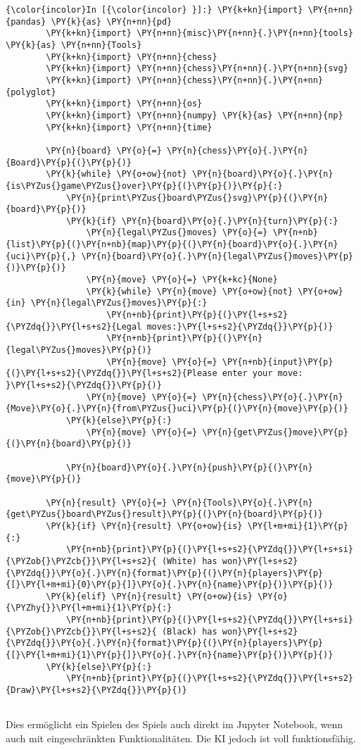     \begin{Verbatim}[commandchars=\\\{\}]
{\color{incolor}In [{\color{incolor} }]:} \PY{k+kn}{import} \PY{n+nn}{pandas} \PY{k}{as} \PY{n+nn}{pd}
        \PY{k+kn}{import} \PY{n+nn}{misc}\PY{n+nn}{.}\PY{n+nn}{tools} \PY{k}{as} \PY{n+nn}{Tools}
        \PY{k+kn}{import} \PY{n+nn}{chess}
        \PY{k+kn}{import} \PY{n+nn}{chess}\PY{n+nn}{.}\PY{n+nn}{svg}
        \PY{k+kn}{import} \PY{n+nn}{chess}\PY{n+nn}{.}\PY{n+nn}{polyglot}
        \PY{k+kn}{import} \PY{n+nn}{os}
        \PY{k+kn}{import} \PY{n+nn}{numpy} \PY{k}{as} \PY{n+nn}{np}
        \PY{k+kn}{import} \PY{n+nn}{time}
        
        \PY{n}{board} \PY{o}{=} \PY{n}{chess}\PY{o}{.}\PY{n}{Board}\PY{p}{(}\PY{p}{)}
        \PY{k}{while} \PY{o+ow}{not} \PY{n}{board}\PY{o}{.}\PY{n}{is\PYZus{}game\PYZus{}over}\PY{p}{(}\PY{p}{)}\PY{p}{:}
            \PY{n}{print\PYZus{}board\PYZus{}svg}\PY{p}{(}\PY{n}{board}\PY{p}{)}
            \PY{k}{if} \PY{n}{board}\PY{o}{.}\PY{n}{turn}\PY{p}{:}
                \PY{n}{legal\PYZus{}moves} \PY{o}{=} \PY{n+nb}{list}\PY{p}{(}\PY{n+nb}{map}\PY{p}{(}\PY{n}{board}\PY{o}{.}\PY{n}{uci}\PY{p}{,} \PY{n}{board}\PY{o}{.}\PY{n}{legal\PYZus{}moves}\PY{p}{)}\PY{p}{)}
                \PY{n}{move} \PY{o}{=} \PY{k+kc}{None}
                \PY{k}{while} \PY{n}{move} \PY{o+ow}{not} \PY{o+ow}{in} \PY{n}{legal\PYZus{}moves}\PY{p}{:}
                    \PY{n+nb}{print}\PY{p}{(}\PY{l+s+s2}{\PYZdq{}}\PY{l+s+s2}{Legal moves:}\PY{l+s+s2}{\PYZdq{}}\PY{p}{)}
                    \PY{n+nb}{print}\PY{p}{(}\PY{n}{legal\PYZus{}moves}\PY{p}{)}
                    \PY{n}{move} \PY{o}{=} \PY{n+nb}{input}\PY{p}{(}\PY{l+s+s2}{\PYZdq{}}\PY{l+s+s2}{Please enter your move: }\PY{l+s+s2}{\PYZdq{}}\PY{p}{)}
                \PY{n}{move} \PY{o}{=} \PY{n}{chess}\PY{o}{.}\PY{n}{Move}\PY{o}{.}\PY{n}{from\PYZus{}uci}\PY{p}{(}\PY{n}{move}\PY{p}{)}
            \PY{k}{else}\PY{p}{:}
                \PY{n}{move} \PY{o}{=} \PY{n}{get\PYZus{}move}\PY{p}{(}\PY{n}{board}\PY{p}{)}
        
            \PY{n}{board}\PY{o}{.}\PY{n}{push}\PY{p}{(}\PY{n}{move}\PY{p}{)}
        
        \PY{n}{result} \PY{o}{=} \PY{n}{Tools}\PY{o}{.}\PY{n}{get\PYZus{}board\PYZus{}result}\PY{p}{(}\PY{n}{board}\PY{p}{)}
        \PY{k}{if} \PY{n}{result} \PY{o+ow}{is} \PY{l+m+mi}{1}\PY{p}{:}
            \PY{n+nb}{print}\PY{p}{(}\PY{l+s+s2}{\PYZdq{}}\PY{l+s+si}{\PYZob{}\PYZcb{}}\PY{l+s+s2}{ (White) has won}\PY{l+s+s2}{\PYZdq{}}\PY{o}{.}\PY{n}{format}\PY{p}{(}\PY{n}{players}\PY{p}{[}\PY{l+m+mi}{0}\PY{p}{]}\PY{o}{.}\PY{n}{name}\PY{p}{)}\PY{p}{)}
        \PY{k}{elif} \PY{n}{result} \PY{o+ow}{is} \PY{o}{\PYZhy{}}\PY{l+m+mi}{1}\PY{p}{:}
            \PY{n+nb}{print}\PY{p}{(}\PY{l+s+s2}{\PYZdq{}}\PY{l+s+si}{\PYZob{}\PYZcb{}}\PY{l+s+s2}{ (Black) has won}\PY{l+s+s2}{\PYZdq{}}\PY{o}{.}\PY{n}{format}\PY{p}{(}\PY{n}{players}\PY{p}{[}\PY{l+m+mi}{1}\PY{p}{]}\PY{o}{.}\PY{n}{name}\PY{p}{)}\PY{p}{)}
        \PY{k}{else}\PY{p}{:}
            \PY{n+nb}{print}\PY{p}{(}\PY{l+s+s2}{\PYZdq{}}\PY{l+s+s2}{Draw}\PY{l+s+s2}{\PYZdq{}}\PY{p}{)}
            
\end{Verbatim}

Dies ermöglicht ein Spielen des Spiels auch direkt im Jupyter Notebook, wenn auch mit eingeschränkten Funktionalitäten. Die KI jedoch ist voll funktionsfähig.
